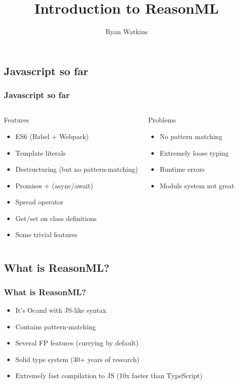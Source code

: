 \documentclass{beamer}
\author{Ryan Watkins}
\title{Introduction to ReasonML}
\begin{document}
\begin{frame}
  \titlepage
\end{frame}

\begin{frame}
  \section{Javascript so far}
  \frametitle{Javascript so far}
  \pause
  \begin{columns}
    \begin{block}{Features}
      \begin{itemize}
      \item ES6 (Babel + Webpack)
        \pause
      \item Template literals
        \pause
      \item Destructuring (but no pattern-matching)
        \pause
      \item Promises + (async/await)
        \pause
      \item Spread operator
        \pause
      \item Get/set on class definitions
        \pause
      \item Some trivial features
      \end{itemize}
    \end{block}
    \begin{block}{Problems}
      \begin{itemize}
      \item No pattern matching
        \pause
      \item Extremely loose typing
        \pause
      \item Runtime errors
        \pause
      \item Module system not great
      \end{itemize}
    \end{block}
  \end{columns}
\end{frame}

\begin{frame}
  \section{What is ReasonML?}
  \frametitle{What is ReasonML?}
  \pause
  \begin{itemize}
  \item It's Ocaml with JS-like syntax
    \pause
  \item Contains pattern-matching
    \pause
  \item Several FP features (currying by default)
    \pause
  \item Solid type system (30+ years of research)
    \pause
  \item Extremely fast compilation to JS (10x faster than TypeScript)
    \pause
  \end{itemize}
\end{frame}
\end{document}
